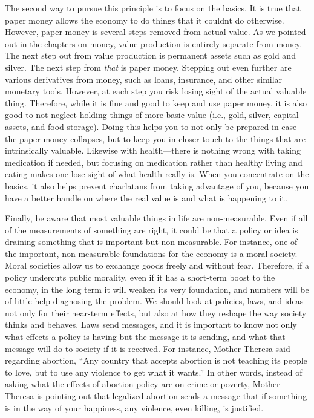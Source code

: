 The second way to pursue this principle is to focus on the basics. It is
true that paper money allows the economy to do things that it
couldn{\textquotesingle}t do otherwise. However, paper money is several
steps removed from actual value. As we pointed out in the chapters on
money, value production is entirely separate from money. The next step
out from value production is permanent assets such as gold and silver.
The next step from \textit{that} is paper money. Stepping out even
further are various derivatives from money, such as loans, insurance,
and other similar monetary tools. However, at each step you risk losing
sight of the actual valuable thing. Therefore, while it is fine and
good to keep and use paper money, it is also good to not neglect
holding things of more basic value
(i.e., gold, silver,
capital assets, and food
storage). Doing this
helps you to not only be prepared in case the paper money collapses,
but to keep
you in closer touch
to the things that are intrinsically valuable. Likewise with
health—there is nothing wrong with taking medication if needed, but
focusing on medication rather than healthy living and eating makes
one lose sight of
what health really
is. When you concentrate on the basics, it also helps prevent
charlatans from taking advantage of you, because you have a better
handle on where the real value is and what is happening to it.


Finally, be aware that most valuable things in life are non-measurable.
Even if all of the measurements of something are right, it could be
that a policy or idea is draining something that is important but
non-measurable.  For
instance, one of the important, non-measurable foundations for the
economy is a moral society.  Moral societies allow us to exchange goods
freely and without fear.  Therefore, if a policy undercuts public
morality, even if it has a short-term boost to the economy, in the long
term it will weaken its very foundation, and numbers will be of little
help diagnosing the problem.  We should look at policies, laws, and
ideas not only for their near-term effects, but also at how they
reshape the way society thinks and behaves. Laws send messages, and it
is important to know not only what effects a policy is having but the
message it is sending, and what that message will do to society if it
is received. For instance, Mother Theresa said
regarding abortion,
“Any country that accepts abortion is not teaching its people to love,
but to use any violence to get what it wants.”  In other words, instead
of asking what the effects of abortion policy are on crime or poverty,
Mother Theresa is pointing out that legalized abortion sends a message
that if something is in the way of your happiness, any violence, even
killing, is justified.  

